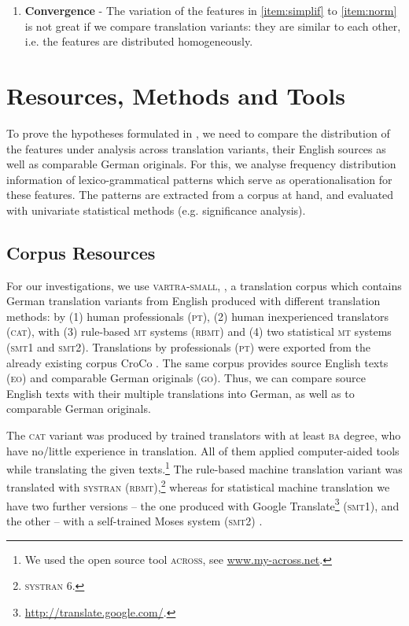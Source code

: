\documentclass[output=paper]{LSP/langsci}
\begin{document}
\begin{enumerate}
\item \textbf{Convergence} - The variation of the features in \ref{item:simplif} to \ref{item:norm} is not great if we compare translation variants: they are similar to each other, i.e. the features are distributed homogeneously.
\end{enumerate}

\section{Resources, Methods and Tools} \label{sec:4:3}

To prove the hypotheses formulated in , we need to compare the distribution of the features under analysis across translation variants, their English sources as well as comparable German originals. For this, we analyse frequency distribution information of lexico-grammatical patterns which serve as operationalisation for these features. The patterns are extracted from a corpus at hand, and evaluated with univariate statistical methods (e.g. significance analysis).

\subsection{Corpus Resources} \label{sec:4:3:1}
For our investigations, we use \textsc{vartra}-\textsc{small}, \citep[see][]{Lapshinova2013}, a translation corpus which contains German translation variants from English produced with different translation methods: by (1) human professionals (\textsc{pt}), (2) human inexperienced translators (\textsc{cat}), with (3) rule-based \textsc{mt} systems (\textsc{rbmt}) and (4) two statistical \textsc{mt} systems (\textsc{smt}1 and \textsc{smt}2). Translations by professionals (\textsc{pt}) were exported from the already existing corpus CroCo \citep{HansenSchirra2013}. The same corpus provides source English texts (\textsc{eo}) and comparable German originals (\textsc{go}). Thus, we can compare source English texts with their multiple translations into German, as well as to comparable German originals.

The \textsc{cat} variant was produced by trained translators with at least \textsc{ba} degree, who have no/little experience in translation. All of them applied computer-aided tools while translating the given texts.\footnote{We used the open source tool \textsc{across}, see \url{www.my-across.net}.} The rule-based machine translation variant was translated with \textsc{sy}\textsc{stran} (\textsc{rbmt}),\footnote{\textsc{sy}\textsc{stran} 6.} whereas for statistical machine translation we have two further versions – the one produced with Google Translate\footnote{\url{http://translate.google.com/}.} (\textsc{smt}1), and the other -- with a self-trained Moses system (\textsc{smt}2) \citep[see][]{Hoang2007}.
\end{document}
